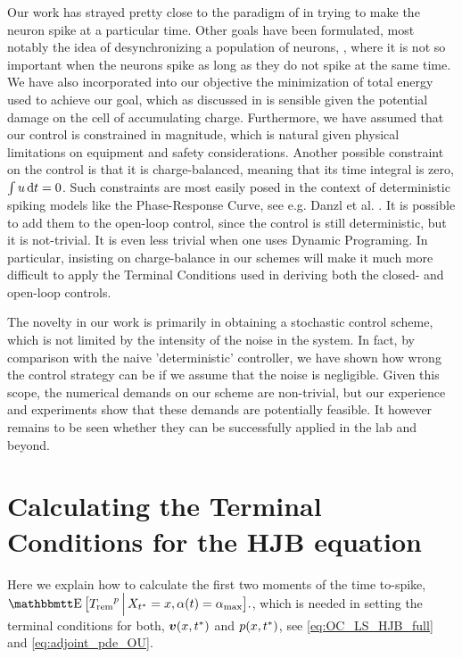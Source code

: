 \documentclass[12pt]{iopart}
\begin{document}
Our work has strayed pretty close to the paradigm of \cite{Ahmadian2011} in
trying to make the neuron spike at a particular time. Other goals have been
formulated, most notably the idea of desynchronizing a population of neurons,
\cite{Nabi2011}, where it is not so important when the neurons spike as long as
they do not spike at the same time. We have also incorporated into our objective
the minimization of total energy used to achieve our goal, which as discussed in
\cite{Ahmadian2011} is sensible given the potential damage on the cell of
accumulating charge. Furthermore, we have assumed that our control is
constrained in magnitude, which is natural given physical limitations on
equipment and safety considerations. Another possible constraint on the control
is that it is charge-balanced, meaning that its time integral is zero, $\int u
\, \mathrm{d} t = 0$. Such constraints are most easily posed in the context of
deterministic spiking models like the Phase-Response Curve, see e.g. Danzl et
al. \cite{Danzl2010}. It is possible to add them to the open-loop control, since
the control is still deterministic, but it is not-trivial. It is even less
trivial when one uses Dynamic Programing. In
particular, insisting on charge-balance in our schemes will make it much more
difficult to apply the Terminal Conditions used in deriving both the closed- and
open-loop controls.

The novelty in our work is primarily in obtaining a stochastic control scheme,
which is not limited by the intensity of the noise in the system. In fact, by
comparison with the naive 'deterministic' controller, we have shown how wrong
the control strategy can be if we assume that the noise is negligible. Given
this scope, the numerical demands on our scheme are non-trivial, but our
experience and experiments show that these demands are potentially feasible. It
however remains to be seen whether they can be successfully applied in the lab
and beyond.


\appendix
\section{Calculating the Terminal Conditions for the HJB equation}
\label{sec:valuefun_TCs}
Here we explain how to calculate the first two moments of the time to-spike,
$\Exp \big[\trem^p \,\Big|\, X_\T = x, \a(t) = \amax \big].$, which is needed in setting the terminal conditions for both,
${ \boldsymbol{v} }(x,{ t^* })$ and $p(x,{ t^* })$, see \cref{eq:OC_LS_HJB_full} and \cref{eq:adjoint_pde_OU}.
\end{document}
